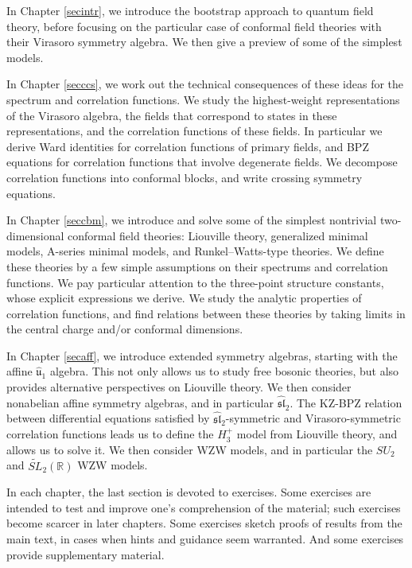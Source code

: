 \documentclass[12pt, a4paper, notitlepage, twoside]{report}
\numberwithin{equation}{section}
\theoremstyle{break}
\begin{document}
In Chapter \ref{secintr}, we introduce the bootstrap approach to quantum field theory, before focusing on the particular case of conformal field theories with their Virasoro symmetry algebra.
We then give a preview of some of the simplest models.

In Chapter \ref{secccs}, we work out the technical consequences of these ideas for the spectrum and correlation functions.
We study the highest-weight representations of the Virasoro algebra, the fields that correspond to states in these representations, and the correlation functions of these fields. 
In particular we derive Ward identities for correlation functions of primary fields, and BPZ equations for correlation functions that involve degenerate fields. 
We decompose correlation functions into conformal blocks, and write crossing symmetry equations.

In Chapter \ref{seccbm}, we introduce and solve some of the simplest nontrivial two-dimensional conformal field theories: Liouville theory, generalized minimal models, A-series minimal models, and Runkel--Watts-type theories.
We define these theories by a few simple assumptions on their spectrums and correlation functions.
We pay particular attention to the three-point structure constants, whose explicit expressions we derive. 
We study the analytic properties of correlation functions, and find relations between these theories by taking limits in the central charge and/or conformal dimensions.

In Chapter \ref{secaff}, we introduce extended symmetry algebras, starting with the affine $\hat{\mathfrak{u}}_1$ algebra.
This not only allows us to study free bosonic theories, but also provides alternative perspectives on Liouville theory.
We then consider nonabelian affine symmetry algebras, and in particular $\widehat{\mathfrak{sl}}_2$.
The KZ-BPZ relation between differential equations satisfied by $\widehat{\mathfrak{sl}}_2$-symmetric and Virasoro-symmetric correlation functions leads us to define the $H_3^+$ model from Liouville theory, and allows us to solve it.
We then consider WZW models, and in particular the $SU_2$ and $\widetilde{SL}_2(\mathbb{R})$ WZW models. 

In each chapter, the last section is devoted to exercises.
Some exercises are intended to test and improve one's comprehension of the material; such exercises become scarcer in later chapters.
Some exercises sketch proofs of results from the main text, in cases when hints and guidance seem warranted.
And some exercises provide supplementary material.
\end{document}
